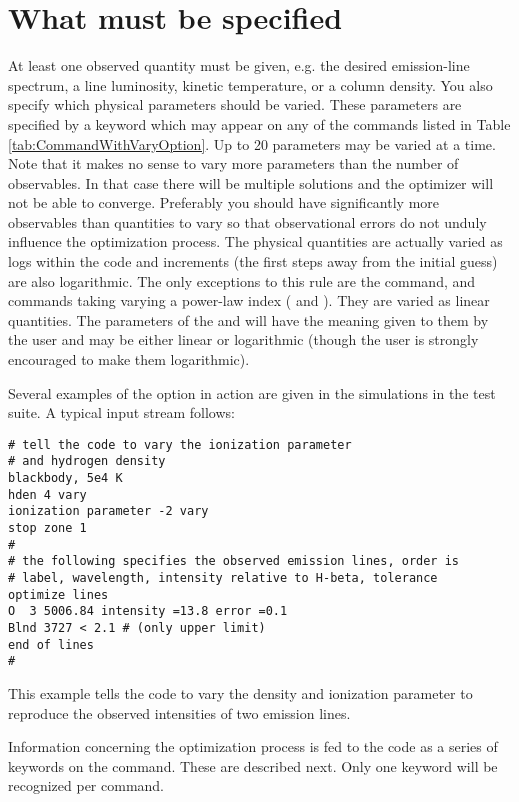 \section{What must be specified}

At least one observed quantity must be given, e.g. the desired emission-line spectrum, a line luminosity,
kinetic temperature, or a column density.
You also specify
which physical parameters should be varied.
These parameters are specified by a
keyword  which may appear on any of the
commands listed in
Table \ref{tab:CommandWithVaryOption}.
Up to 20 parameters may be varied at a time.
Note that it makes no sense to vary more parameters than the number of observables.
In that case there will be multiple solutions and the optimizer will not be able to
converge. Preferably you should have significantly more observables than quantities
to vary so that observational errors do not unduly influence the optimization process.
The physical quantities
are actually varied as logs within the code and increments
(the first steps away from the initial guess)
are also logarithmic. The only exceptions to this rule are the
 command, and commands taking varying a power-law index
( and ).
They are varied as linear quantities.
The parameters of the  and  will
have the meaning given to them by the user and may be either linear or
logarithmic (though the user is strongly encouraged to make them logarithmic).

Several examples of the  option in action
are given in the
 simulations in the test suite.
A typical input stream follows:
\begin{verbatim}
# tell the code to vary the ionization parameter
# and hydrogen density
blackbody, 5e4 K
hden 4 vary
ionization parameter -2 vary
stop zone 1
#
# the following specifies the observed emission lines, order is
# label, wavelength, intensity relative to H-beta, tolerance
optimize lines
O  3 5006.84 intensity =13.8 error =0.1
Blnd 3727 < 2.1 # (only upper limit)
end of lines
#
\end{verbatim}
This example tells the code to vary the density and ionization parameter
to reproduce the observed intensities of two emission lines.

Information concerning the optimization process is fed to the code
as a series of keywords on the  command.
These are described next.
Only one keyword will be recognized per  command.

